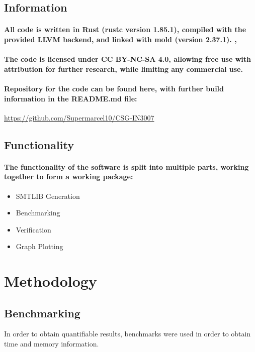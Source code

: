 \documentclass[a4paper]{report}
\begin{document}
\subsection{Information}
\paragraph{
    All code is written in Rust (rustc version 1.85.1), compiled with the provided LLVM backend, and linked with mold (version 2.37.1). \cite{rust}, \cite{mold}
}

\paragraph{
    The code is licensed under CC BY-NC-SA 4.0, allowing free use with attribution for further research, while limiting any commercial use. \cite{cc_by-nc-sa}
}

\paragraph{
    Repository for the code can be found here, with further build information in the README.md file:
}

\begin{center}
    \url{https://github.com/Supermarcel10/CSG-IN3007}
\end{center}


\subsection{Functionality}
\paragraph{
    The functionality of the software is split into multiple parts, working together to form a working package:
}

\begin{itemize}
    \item SMTLIB Generation
    \item Benchmarking
    \item Verification
    \item Graph Plotting
\end{itemize}


\section{Methodology}
\subsection{Benchmarking}
In order to obtain quantifiable results, benchmarks were used in order to obtain time and memory information.
\end{document}
